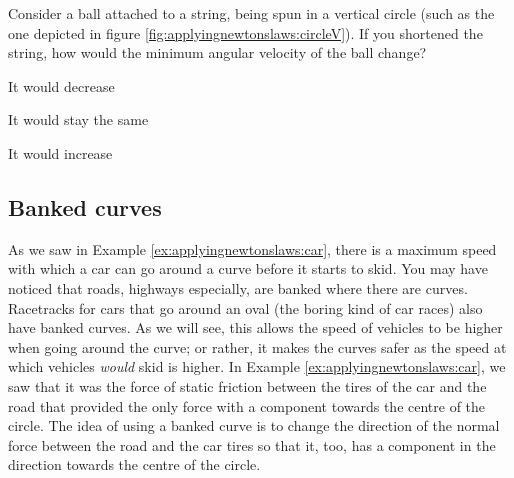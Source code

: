 \begin{checkpoint}
\begin{MCquestion}{Consider a ball attached to a string, being spun in a vertical circle (such as the one depicted in figure \ref{fig:applyingnewtonslaws:circleV}). If you shortened the string, how would the minimum angular velocity of the ball change?}
\item It would decrease %
\item It would stay the same
\item It would increase
\end{MCquestion}
\end{checkpoint}

\subsection{Banked curves}
As we saw in Example \ref{ex:applyingnewtonslaws:car}, there is a maximum speed with which a car can go around a curve before it starts to skid. You may have noticed that roads, highways especially, are banked where there are curves. Racetracks for cars that go around an oval (the boring kind of car races) also have banked curves. As we will see, this allows the speed of vehicles to be higher when going around the curve; or rather, it makes the curves safer as the speed at which vehicles \textit{would} skid is higher. In Example \ref{ex:applyingnewtonslaws:car}, we saw that it was the force of static friction between the tires of the car and the road that provided the only force with a component towards the centre of the circle. The idea of using a banked curve is to change the direction of the normal force between the road and the car tires so that it, too, has a component in the direction towards the centre of the circle. 

